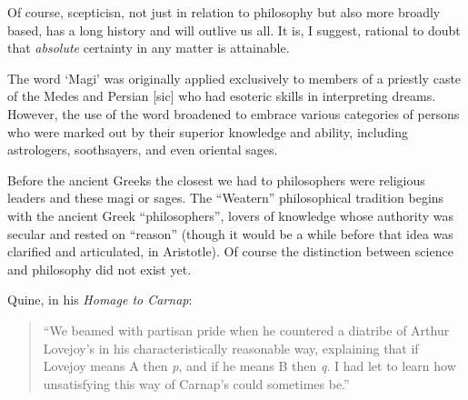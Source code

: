 \documentclass[10pt,titlepage]{article}
\begin{document}
Of course, scepticisn, not just in relation to philosophy but also more broadly based, has a long history and will outlive us all.
It is, I suggest, rational to doubt that {\it absolute} certainty in any matter is attainable.

The word `Magi' was originally applied exclusively to members of a priestly caste of the Medes and Persian [sic] who had esoteric skills in interpreting dreams. However, the use of the word broadened to embrace various categories of persons who were marked out by their superior knowledge and ability, including astrologers, soothsayers, and even oriental sages.

Before the ancient Greeks the closest we had to philosophers were religious leaders and these magi or sages.
The ``Weatern'' philosophical tradition begins with the ancient Greek ``philosophers'', lovers of knowledge whose authority was secular and rested on ``reason'' (though it would be a while before that idea was clarified and articulated, in Aristotle).
Of course the distinction between science and philosophy did not exist yet.

Quine, in his {\it Homage to Carnap}:
\begin{quote}
  ``We beamed with partisan pride when he countered a diatribe of Arthur Lovejoy's in his characteristically reasonable way, explaining that if Lovejoy means A then {\it p}, and if he means B then {\it q}.
  I had let to learn how unsatisfying this way of Carnap's could sometimes be.''
\end{quote}




\appendix









\end{document}
